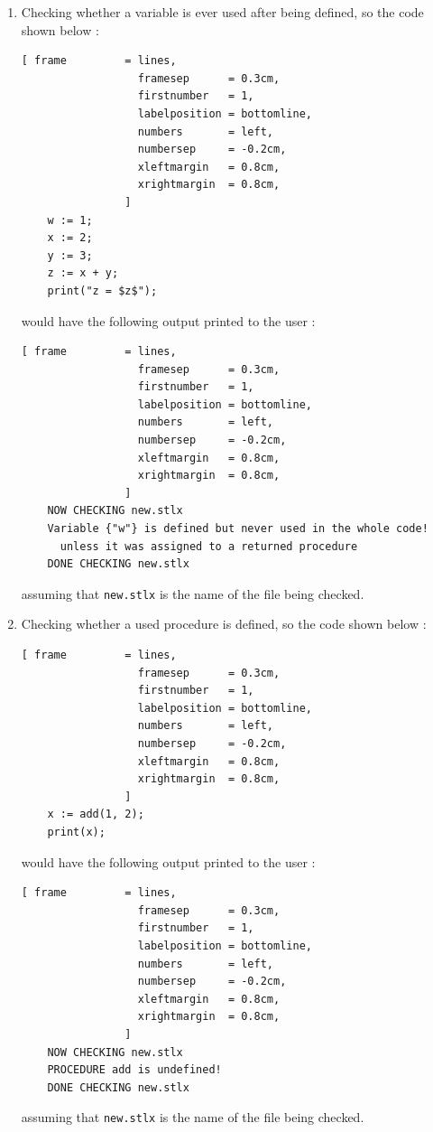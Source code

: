 \documentclass[11pt]{report}
\begin{document}
\begin{enumerate}
\item Checking whether a variable is ever used after being defined, so the code shown below :
\begin{Verbatim}[ frame         = lines, 
                  framesep      = 0.3cm, 
                  firstnumber   = 1,
                  labelposition = bottomline,
                  numbers       = left,
                  numbersep     = -0.2cm,
                  xleftmargin   = 0.8cm,
                  xrightmargin  = 0.8cm,
                ]
    w := 1;
    x := 2;
    y := 3;
    z := x + y;
    print("z = $z$");
\end{Verbatim}
would have the following output printed to the user :
\pagebreak
\begin{Verbatim}[ frame         = lines, 
                  framesep      = 0.3cm, 
                  firstnumber   = 1,
                  labelposition = bottomline,
                  numbers       = left,
                  numbersep     = -0.2cm,
                  xleftmargin   = 0.8cm,
                  xrightmargin  = 0.8cm,
                ]
    NOW CHECKING new.stlx
    Variable {"w"} is defined but never used in the whole code! 
      unless it was assigned to a returned procedure
    DONE CHECKING new.stlx
\end{Verbatim}
assuming that \texttt{new.stlx} is the name of the file being checked.

\item Checking whether a used procedure is defined, so the code shown below :
\begin{Verbatim}[ frame         = lines, 
                  framesep      = 0.3cm, 
                  firstnumber   = 1,
                  labelposition = bottomline,
                  numbers       = left,
                  numbersep     = -0.2cm,
                  xleftmargin   = 0.8cm,
                  xrightmargin  = 0.8cm,
                ]
    x := add(1, 2);
    print(x);
\end{Verbatim}
would have the following output printed to the user :
\begin{Verbatim}[ frame         = lines, 
                  framesep      = 0.3cm, 
                  firstnumber   = 1,
                  labelposition = bottomline,
                  numbers       = left,
                  numbersep     = -0.2cm,
                  xleftmargin   = 0.8cm,
                  xrightmargin  = 0.8cm,
                ]
    NOW CHECKING new.stlx
    PROCEDURE add is undefined!
    DONE CHECKING new.stlx
\end{Verbatim}
assuming that \texttt{new.stlx} is the name of the file being checked.


\end{enumerate}
\end{document}
